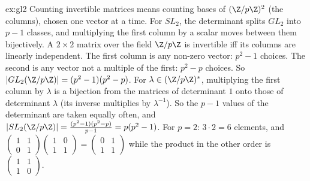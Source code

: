\begin{solution}{ex:gl2}
\idea Counting invertible matrices means counting bases of $(\Z/p\Z)^2$ (the columns), chosen one vector at a time. For $SL_2$, the determinant splits $GL_2$ into $p-1$ classes, and multiplying the first column by a scalar moves between them bijectively.
\writeup A $2\times2$ matrix over the field $\Z/p\Z$ is invertible iff its columns are linearly independent. The first column is any non-zero vector: $p^2-1$ choices. The second is any vector not a multiple of the first: $p^2-p$ choices. So $|GL_2(\Z/p\Z)|=(p^2-1)(p^2-p)$.
For $\lambda\in(\Z/p\Z)^*$, multiplying the first column by $\lambda$ is a bijection from the matrices of determinant $1$ onto those of determinant $\lambda$ (its inverse multiplies by $\lambda^{-1}$). So the $p-1$ values of the determinant are taken equally often, and $|SL_2(\Z/p\Z)|=\frac{(p^2-1)(p^2-p)}{p-1}=p(p^2-1)$.
For $p=2$: $3\cdot2=6$ elements, and $\begin{pmatrix}1&1\\0&1\end{pmatrix}\begin{pmatrix}1&0\\1&1\end{pmatrix}=\begin{pmatrix}0&1\\1&1\end{pmatrix}$ while the product in the other order is $\begin{pmatrix}1&1\\1&0\end{pmatrix}$.
\end{solution}

